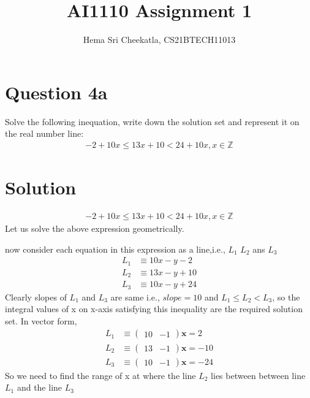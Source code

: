 \documentclass[16pt, a4paper, two column]{article}
\title{AI1110 Assignment 1}
\author{Hema Sri Cheekatla, CS21BTECH11013}
\newcommand{\myvec}[1]{\ensuremath{\begin{pmatrix}#1\end{pmatrix}}}
\let\vec\mathbf
\begin{document}
\maketitle
\section*{Question 4a}
Solve the following inequation, write down the solution set and represent it on the real number line:
\begin{align*}
  -2 + 10x \leq 13x + 10 < 24 + 10x,  x\in \mathbb{Z} 
\end{align*}
\section*{Solution}
\begin{align}
  -2 + 10x \leq 13x + 10 < 24 + 10x,  x\in \mathbb{Z} 
\end{align}
\noindent Let us solve the above expression geometrically.

now consider each equation in this expression as a line,i.e., $L_1$ $L_2$ ans $L_3$
\begin{align}
L_1 &\equiv 10x-y-2  \\
L_2 &\equiv 13x-y+10 \\
L_3 &\equiv 10x-y+24
\end{align}
Clearly slopes of $L_1$ and $L_3$ are same i.e., $slope = 10$\newline
and $L_1 \leq L_2 < L_3 $, so the integral values of x on x-axis satisfying this inequality are the required solution set.
In vector form,
\begin{align}
	L_1 &\equiv \myvec{10 & -1}\vec{x} = 2 \\
	L_2 &\equiv \myvec{13 & -1} \vec{x} = -10 \\
	L_3 &\equiv \myvec{10 & -1}\vec{x} = -24
\end{align}
So we need to find the range of x at where the line $L_2$ lies between between line $L_1$ and the line $L_3$
\end{document}
